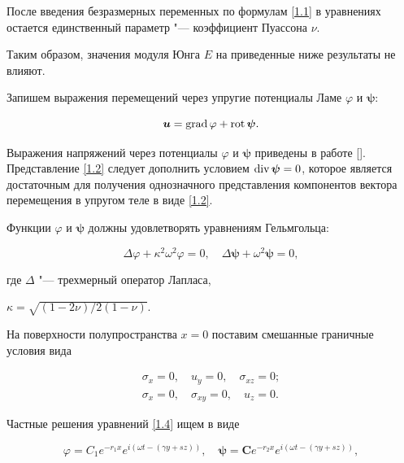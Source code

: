 После введения безразмерных переменных по формулам \eqref{1.1} в уравнениях остается единственный параметр "--- коэффициент Пуассона $\nu$. 

Таким образом, значения модуля Юнга $E$ на приведенные ниже результаты не влияют. 

Запишем выражения перемещений через упругие потенциалы Ламе $\varphi$ и $\boldsymbol{\psi}$:

\begin{equation}

\label{1.2}

 \boldsymbol{u} = \mathop{\rm grad}\varphi + \mathop{\rm rot} \boldsymbol{\psi}.

\end{equation}

Выражения напряжений через потенциалы $\varphi$ и $\boldsymbol{\psi}$ приведены в работе  []. Представление \eqref{1.2} следует дополнить условием $ \mathop{\rm div}\boldsymbol{\psi}=0$, которое является достаточным для получения однозначного представления компонентов вектора перемещения в  упругом теле в виде \eqref{1.2}. 

Функции $\varphi$ и $\boldsymbol{\psi}$ должны удовлетворять уравнениям Гельмгольца:

\begin{equation}

\label{1.4}

 \Delta\varphi + \kappa^2 \omega^2\varphi = 0, \quad  \Delta\boldsymbol{\psi} + \omega^2\boldsymbol{\psi} = 0,

\end{equation}

где $\Delta$ "--- трехмерный оператор Лапласа, 

$\kappa = \sqrt{(1-2\nu)/2(1-\nu)}$.

На поверхности полупространства $x=0$ поставим смешанные граничные условия вида

\begin{gather}

\sigma_x = 0, \quad  u_y = 0, \quad  \sigma_{xz}=0; \label{1.5.2} \\

\sigma_x = 0, \quad \sigma_{xy} = 0, \quad  u_z=0. \label{1.5.3} 

\end{gather}

Частные решения уравнений \eqref{1.4} ищем в виде

\begin{equation}

\label{1.6}

 \varphi = C_1 e^{-r_1 x} e^{i(\omega t - (\gamma y + s z))}, \quad  \boldsymbol{\psi} = \boldsymbol{C} e^{-r_2 x} e^{i(\omega t - (\gamma y + s z))},

\end{equation}

